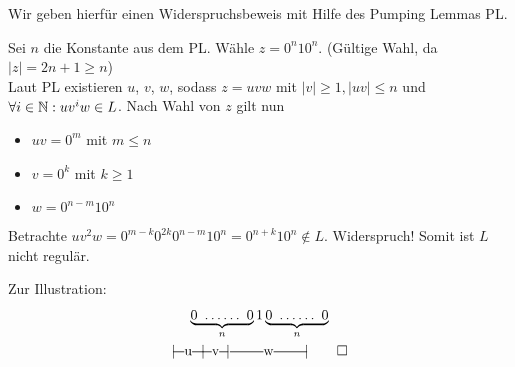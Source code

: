 {\begin{Bsp}
        Wir geben hierfür einen Widerspruchsbeweis mit Hilfe des Pumping Lemmas \ac{PL}.
        
        Sei $n$ die Konstante aus dem \ac{PL}. Wähle $z=0^n10^n$. 
        (Gültige Wahl, da $|z|=2n+1\geq n$)\\
        Laut PL existieren $u$, $v$, $w$, sodass $z=uvw$ mit $|v|\geq 1, |uv|\leq n$ und $\forall i \in \mathbb{N}: uv^iw \in L$. 
        Nach Wahl von $z$ gilt nun
  \begin{itemize}
  \item $uv = 0^m$ mit $m\leq n$
  \item $v = 0^k$ mit $k\geq 1$
  \item $w = 0^{n-m}10^n$ 
  \end{itemize}
  Betrachte $uv^2w = 0^{m-k}0^{2k}0^{n-m}10^n = 0^{n+k}10^n \notin L$. Widerspruch!
  Somit ist $L$ nicht regulär.
  
  Zur Illustration:
  \begin{gather*}
    \underbrace{0\ \dots\dots\ 0}_{n} 1 \underbrace{0\ \dots\dots\ 0}_{n}\\
    |\!\ruleplaceholder[u]{\widthof{0\ \dots }} \!|\! \ruleplaceholder[v]{\widthof{\dots 0}}\!|%
    \ruleplaceholder[w]{\widthof{\ \ \ $1\ \dots\dots\ 1$}}\!|
    \qedhere
  \end{gather*}
\end{Bsp}

}

